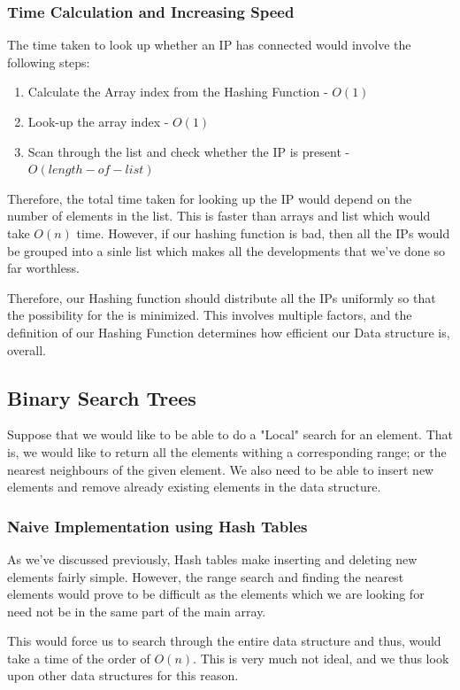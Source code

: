 \documentclass{article}
\theoremstyle{definition}
\theoremstyle{example}
\begin{document}
\subsubsection{\Large Time Calculation and Increasing Speed}
\hspace{4mm} The time taken to look up whether an IP has connected would involve the following steps:
\begin{enumerate}
    \item Calculate the Array index from the Hashing Function - $O(1)$
    \item Look-up the array index - $O(1)$
    \item Scan through the list and check whether the IP is present - $O(length-of-list)$
\end{enumerate}
Therefore, the total time taken for looking up the IP would depend on the number of elements in the list. This is faster than arrays and list which would take $O(n)$ time. However, if our hashing function is bad, then all the IPs would be grouped into a sinle list which makes all the developments that we've done so far worthless.\par
\vspace{4mm}
Therefore, our Hashing function should distribute all the IPs uniformly so that the possibility for the is minimized. This involves multiple factors, and the definition of our Hashing Function determines how efficient our Data structure is, overall.

\newpage
\subsection{\Large Binary Search Trees}
\hspace{4mm} Suppose that we would like to be able to do a "Local" search for an element. That is, we would like to return all the elements withing a corresponding range; or the nearest neighbours of the given element. We also need to be able to insert new elements and remove already existing elements in the data structure.\par

\subsubsection{\Large Naive Implementation using Hash Tables}
\hspace{4mm} As we've discussed previously, Hash tables make inserting and deleting new elements fairly simple. However, the range search and finding the nearest elements would prove to be difficult as the elements which we are looking for need not be in the same part of the main array. \par
\vspace{4mm}
This would force us to search through the entire data structure and thus, would take a time of the order of $O(n)$. This is very much not ideal, and we thus look upon other data structures for this reason.
\end{document}
